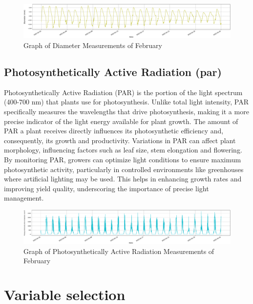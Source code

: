 \begin{figure}[htbp]
    \centering
    \includegraphics[width=15 cm]{4_ChapterMaterials/figuras/train_data_Diameter.pdf}
    \caption{Graph of Diameter Measurements of February}
    \end{figure}

\subsection{Photosynthetically Active Radiation (par)}

Photosynthetically Active Radiation (PAR) is the portion of the light spectrum (400-700 nm) that plants use for photosynthesis. Unlike total light intensity, PAR specifically measures the wavelengths that drive photosynthesis, making it a more precise indicator of the light energy available for plant growth. The amount of PAR a plant receives directly influences its photosynthetic efficiency and, consequently, its growth and productivity. Variations in PAR can affect plant morphology, influencing factors such as leaf size, stem elongation and flowering. By monitoring PAR, growers can optimize light conditions to ensure maximum photosynthetic activity, particularly in controlled environments like greenhouses where artificial lighting may be used. This helps in enhancing growth rates and improving yield quality, underscoring the importance of precise light management.

\begin{figure}[htbp]
    \centering
    \includegraphics[width=15 cm]{4_ChapterMaterials/figuras/train_data_Photosynthetically_Active_Radiation.pdf}
    \caption{Graph of Photosynthetically Active Radiation Measurements of February}
    \end{figure}

\section{Variable selection}

